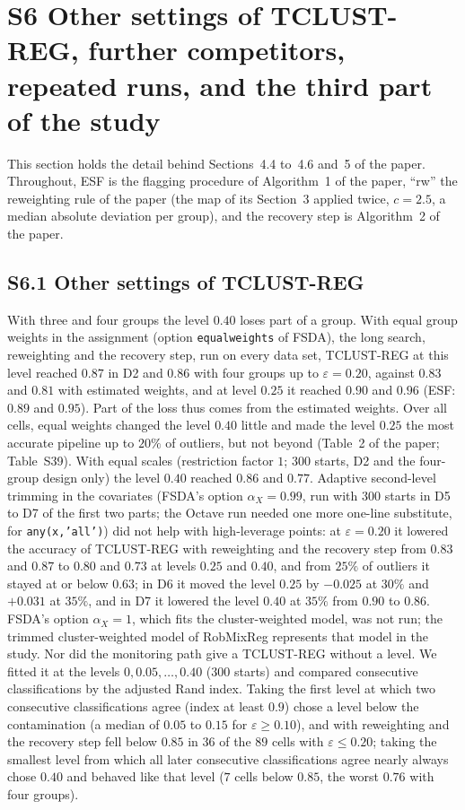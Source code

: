 \clearpage
\section*{S6 Other settings of TCLUST-REG, further competitors, repeated runs, and the third part of the study}
\label{supp:r10}

This section holds the detail behind Sections~4.4 to~4.6 and~5 of the paper. Throughout,
ESF is the flagging procedure of Algorithm~1 of the paper, ``rw'' the reweighting rule of the
paper (the map of its Section~3 applied twice, $c=2.5$, a median absolute deviation per
group), and the recovery step is Algorithm~2 of the paper.

\subsection*{S6.1 Other settings of TCLUST-REG}

With three and four groups the level $0.40$ loses part of a group. With equal group weights in
the assignment (option \texttt{equalweights} of FSDA), the long search, reweighting and the
recovery step, run on every data set, TCLUST-REG at this level reached $0.87$ in D2 and $0.86$
with four groups up to $\varepsilon=0.20$, against $0.83$ and $0.81$ with estimated weights,
and at level $0.25$ it reached $0.90$ and $0.96$ (ESF: $0.89$ and $0.95$). Part of the loss
thus comes from the estimated weights. Over all cells, equal weights changed the level $0.40$
little and made the level $0.25$ the most accurate pipeline up to $20\%$ of outliers, but not
beyond (Table~2 of the paper; Table~S39). With equal scales (restriction factor $1$; $300$
starts, D2 and the four-group design only) the level $0.40$ reached $0.86$ and $0.77$. Adaptive second-level trimming in the covariates (FSDA's option
$\alpha_X=0.99$, run with $300$ starts in D5 to D7 of the first two parts; the Octave run
needed one more one-line substitute, for \texttt{any(x,'all')}) did not help with
high-leverage points: at $\varepsilon=0.20$ it lowered the accuracy of TCLUST-REG with
reweighting and the recovery step from $0.83$ and $0.87$ to $0.80$ and $0.73$ at levels $0.25$
and $0.40$, and from $25\%$ of outliers it stayed at or below $0.63$; in D6 it moved the level $0.25$ by
$-0.025$ at $30\%$ and $+0.031$ at $35\%$,
and in D7 it lowered the level $0.40$ at $35\%$ from $0.90$ to $0.86$. FSDA's option
$\alpha_X=1$, which fits the cluster-weighted model, was not run; the trimmed cluster-weighted
model of RobMixReg represents that model in the study. Nor did the monitoring path give a
TCLUST-REG without a level. We fitted it at the levels $0,0.05,\dots,0.40$ ($300$ starts) and
compared consecutive classifications by the adjusted Rand index. Taking the first level at
which two consecutive classifications agree (index at least $0.9$) chose a level below the
contamination (a median of $0.05$ to $0.15$ for $\varepsilon\ge0.10$), and with reweighting and
the recovery step fell below $0.85$ in $36$ of the $89$ cells with $\varepsilon\le0.20$; taking
the smallest level from which all later consecutive classifications agree nearly always chose
$0.40$ and behaved like that level ($7$ cells below $0.85$, the worst $0.76$ with four groups).

